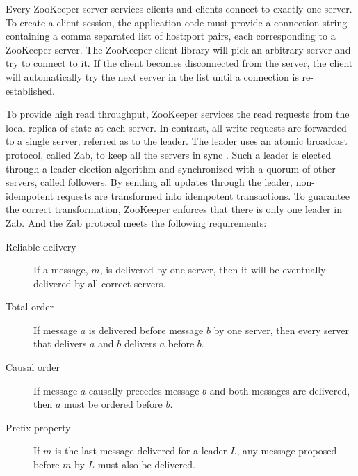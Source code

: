 \documentclass[12pt]{book}
\begin{document}
Every ZooKeeper server services clients and clients connect to exactly one server. To create a client session, the application code must provide a connection string containing a comma separated list of host:port pairs, each corresponding to a ZooKeeper server. The ZooKeeper client library will pick an arbitrary server and try to connect to it. If the client becomes disconnected from the server, the client will automatically try the next server in the list until a connection is re-established.

To provide high read throughput, ZooKeeper services the read requests from the local replica of state at each server. In contrast, all write requests are forwarded to a single server, referred as to the leader. The leader uses an atomic broadcast protocol, called Zab, to keep all the servers in sync \cite{Reed:2008:STO}. Such a leader is elected through a leader election algorithm and synchronized with a quorum of other servers, called followers. By sending all updates through the leader, non-idempotent requests are transformed into idempotent transactions. To guarantee the correct transformation, ZooKeeper enforces that there is only one leader in Zab. And the Zab protocol meets the following requirements:
\begin{description}
\item[Reliable delivery] If a message, $m$, is delivered by one server, then it will be eventually delivered by all correct servers.
\item[Total order] If message $a$ is delivered before message $b$ by one server, then every server that delivers $a$ and $b$ delivers $a$ before $b$.
\item[Causal order] If message $a$ causally precedes message $b$ and both messages are delivered, then $a$ must be ordered before $b$.
\item[Prefix property] If $m$ is the last message delivered for a leader $L$, any message proposed before $m$ by $L$ must also be delivered.
\end{description}
\end{document}
